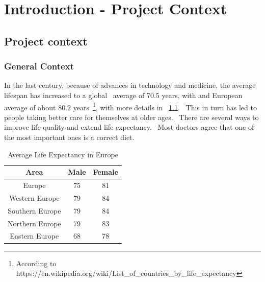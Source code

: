 \usepackage{graphicx}


\chapter{Introduction - Project Context}
\label{ch:introduction}
\pagestyle{headings}

\section{Project context}
\label{sec:introduction-context}

\subsection{General Context}
\label{subsec:introduciton-general-context}

In the last century, because of advances in technology and medicine, the average lifespan has increased to a global \
average of 70.5 years, with and European average of about 80.2 years\
\footnote{According to https://en.wikipedia.org/wiki/List\_of\_countries\_by\_life\_expectancy}, with more details in \
\ref{table:lifeExpectancy}. \
This in turn has led to people taking better care for themselves at older ages. \
There are several ways to improve life quality and extend life expectancy. \
Most doctors agree that one of the most important ones is a correct diet.

\begin{table}[ht]
    \caption{Average Life Expectancy in Europe}
    \centering                          %
    \begin{tabular}{|c|c|c|}          %
        \hline\hline                        %
        Area & Male & Female \\ [0.5ex]   %
        \hline                              %
        Europe & 75 & 81 \\               %
        Western Europe & 79 & 84  \\
        Southern Europe & 79 & 84 \\           %
        Northern Europe & 79 & 83  \\
        Eastern Europe & 68 & 78 \\[1ex]
        \hline
    \end{tabular}
    \label{table:lifeExpectancy}
\end{table}

